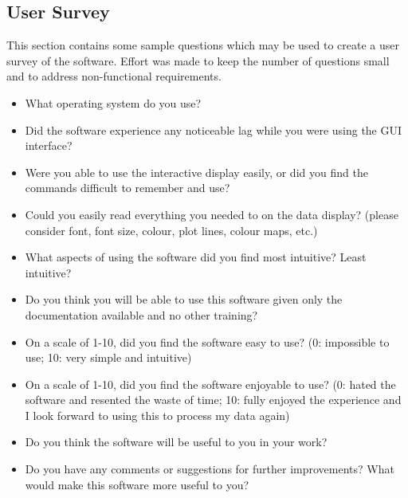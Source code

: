 \documentclass[12pt, titlepage]{article}
\begin{document}
\subsection{User Survey}
\label{App:UserSurv}
This section contains some sample questions which may be used to create a user
survey of the software. Effort was made to keep the number of questions small
and to address non-functional requirements.
\begin{itemize}
\item What operating system do you use?
\item Did the software experience any noticeable lag while you were using the
GUI interface?
\item Were you able to use the interactive display easily, or did you find the
commands difficult to remember and use?
\item Could you easily read everything you needed to on the data display?
(please consider font, font size, colour, plot lines, colour maps, etc.)
\item What aspects of using the software did you find most intuitive? Least
intuitive?
\item Do you think you will be able to use this software given only the
documentation available and no other training?
\item On a scale of 1-10, did you find the software easy to use? (0: impossible
to use; 10: very simple and intuitive)
\item On a scale of 1-10, did you find the software enjoyable to use? (0: hated
the software and resented the waste of time; 10: fully enjoyed the experience
and I look forward to using this to process my data again)
\item Do you think the software will be useful to you in your work?
\item Do you have any comments or suggestions for further improvements? What
would make this software more useful to you?
\end{itemize}

\end{document}
